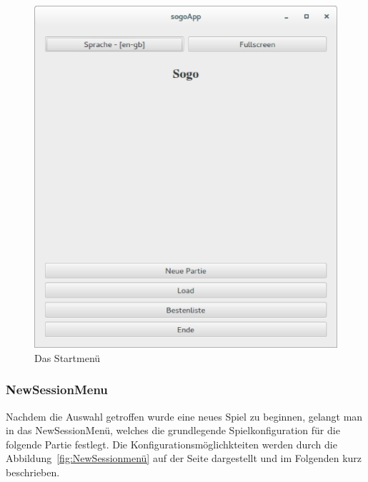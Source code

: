 \documentclass[a4paper]{scrartcl}
\begin{document}
\begin{figure}[H]
 \centering
 \includegraphics[scale=0.35]{graphics/startmenu.eps}
 \caption{Das Startmenü}
 \label{fig:Startmenü}
\end{figure}

\subsubsection{NewSessionMenu}\label{ch:NewSessionMenu}
Nachdem die Auswahl getroffen wurde eine neues Spiel zu beginnen, gelangt man in das NewSessionMenü, welches die grundlegende Spielkonfiguration für die folgende Partie festlegt. Die Konfigurationsmöglichkteiten werden durch die Abbildung~\ref{fig:NewSessionmenü} auf der Seite \pageref{fig:NewSessionmenü} dargestellt und im Folgenden kurz beschrieben. 
\end{document}
